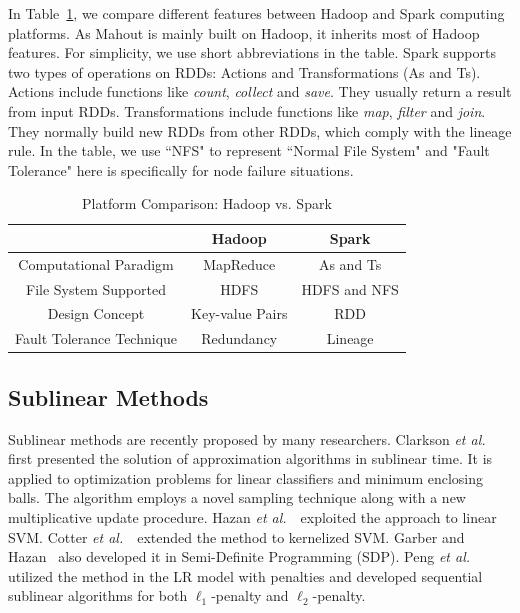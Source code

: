 \documentclass[10pt, conference, compsocconf]{IEEEtran}
\def\etal{{\em et al.\/}\,}
\begin{document}
In Table~\ref{tab:systemcmp}, we compare different features between Hadoop and Spark computing platforms.
As Mahout is mainly built on Hadoop, it inherits most of Hadoop features.
For simplicity, we use short abbreviations in the table.
Spark supports two types of operations on RDDs: Actions and Transformations (As and Ts).
Actions include functions like \textit{count}, \textit{collect} and \textit{save}. They usually return a result from input RDDs.
Transformations include functions like \textit{map}, \textit{filter} and \textit{join}. They normally build new RDDs from other RDDs, which comply with the lineage rule.
In the table, we use ``NFS" to represent ``Normal File System" and "Fault Tolerance" here is specifically for node failure situations.
\begin{table}[h]
\centering
\caption{Platform Comparison: Hadoop vs. Spark}\label{tab:systemcmp}\vspace{-0.3cm}
\begin{tabular}{|c|c|c|}
\hline
           & Hadoop & Spark \\
\hline
Computational Paradigm  & MapReduce & As and Ts \\
\hline
File System Supported & HDFS & HDFS and NFS \\
\hline
Design Concept  & Key-value Pairs & RDD \\
\hline
Fault Tolerance Technique & Redundancy & Lineage \\
\hline
\end{tabular}\vspace{-0.5cm}
\end{table}

\subsection{Sublinear Methods}
Sublinear methods are recently proposed by many researchers.
Clarkson \etal~\cite{clarkson2010sublinear} first presented the solution of approximation algorithms in sublinear time.
It is applied to optimization problems for linear classifiers and minimum enclosing balls.
The algorithm employs a novel sampling technique along with a new multiplicative update procedure.
Hazan \etal~\cite{hazanbeating} exploited the approach to linear SVM.
Cotter \etal~\cite{cotter2012kernelized} extended the method to kernelized SVM.
Garber and Hazan~\cite{garberapproximating} also developed it in Semi-Definite Programming (SDP).
Peng \etal~\cite{peng2012sublinear} utilized the method in the LR model with penalties and developed sequential sublinear algorithms for both $\ell_1$-penalty and $\ell_2$-penalty.
\end{document}
